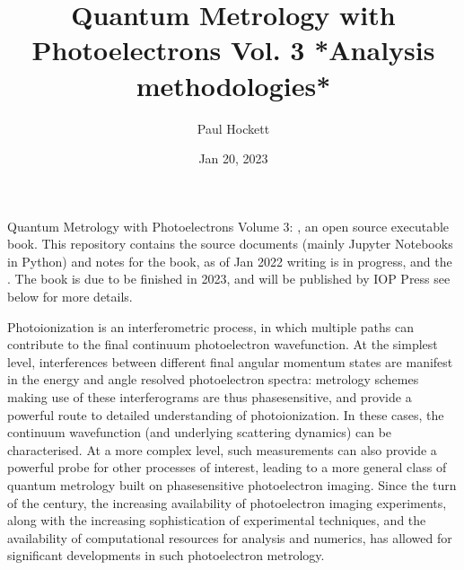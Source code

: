 \documentclass[letterpaper,table,10pt,english]{jupyterBook}
\title{Quantum Metrology with Photoelectrons Vol. 3 *Analysis methodologies*}
\date{Jan 20, 2023}
\author{Paul Hockett}
\begin{document}
\pagestyle{empty}
\sphinxmaketitle
\pagestyle{plain}
\sphinxtableofcontents
\pagestyle{normal}
\label{\detokenize{intro::doc}}


\sphinxAtStartPar
Quantum Metrology with Photoelectrons Volume 3: , an open source executable book. This repository contains the source documents (mainly Jupyter Notebooks in Python) and notes for the book, as of Jan 2022 writing is in progress, and the . The book is due to be finished in 2023, and will be published by IOP Press \sphinxhyphen{} see below for more details.

\begin{DUlineblock}{0em}
\item[] 
\end{DUlineblock}

\sphinxAtStartPar
Photoionization is an interferometric process, in which multiple paths can contribute to the final continuum photoelectron wavefunction. At the simplest level, interferences between different final angular momentum states are manifest in the energy and angle resolved photoelectron spectra: metrology schemes making use of these interferograms are thus phase\sphinxhyphen{}sensitive, and provide a powerful route to detailed understanding of photoionization. In these cases, the continuum wavefunction (and underlying scattering dynamics) can be characterised. At a more complex level, such measurements can also provide a powerful probe for other processes of interest, leading to a more general class of quantum metrology built on phase\sphinxhyphen{}sensitive photoelectron imaging.  Since the turn of the century, the increasing availability of photoelectron imaging experiments, along with the increasing sophistication of experimental techniques, and the availability of computational resources for analysis and numerics, has allowed for significant developments in such photoelectron metrology.

\begin{DUlineblock}{0em}
\item[] 
\end{DUlineblock}
\end{document}
